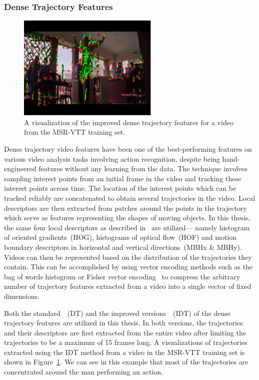\subsubsection{Dense Trajectory Features}
\begin{figure}[t] 
  \centering
  \includegraphics[width=0.6\textwidth]{./images/IDenseTrajVis.png} 
  \caption{A visualization of the improved dense trajectory features for a video
          from the MSR-VTT training set.}
  \label{fig:DenseTrajVis} 
\end{figure}

Dense trajectory video features have been one of the best-performing features
on various video analysis tasks involving action recognition, despite being
hand-engineered features without any learning from the data.
The technique involves sampling interest points from an initial frame in the
video and tracking these interest points across time.
The location of the interest points which can be tracked reliably are concatenated
to obtain several trajectories in the video.
Local descriptors are then extracted from patches around the points in the
trajectory which serve as features representing the shapes of moving objects.
In this thesis, the same four local descriptors as described
in~\cite{DBLP:conf/cvpr/WangKSL11, Wang2013} are utilized--- namely histogram of
oriented gradients~(HOG), histograms of optical flow~(HOF) and motion boundary
descriptors in horizontal and vertical directions~(MBHx \& MBHy).
Videos can then be represented based on the distribution of the trajectories
they contain.
This can be accomplished by using vector encoding methods such as the bag of
words histogram or Fisher vector encoding~\cite{perronnin2010improving} to
compress the arbitrary number of trajectory features extracted from a video into
a single vector of fixed dimensions.

Both the standard~\cite{DBLP:conf/cvpr/WangKSL11}~(DT) and the improved
versions~\cite{Wang2013}~(IDT) of the dense trajectory features are utilized in
this thesis.
In both versions, the trajectories and their descriptors are first extracted
from the entire video after limiting the trajectories to be a maximum of 15
frames long.
A visualizations of trajectories extracted using the IDT method from a video in
the MSR-VTT training set is shown in Figure~\ref{fig:DenseTrajVis}.
We can see in this example that most of the trajectories are concentrated around
the man performing an action.

